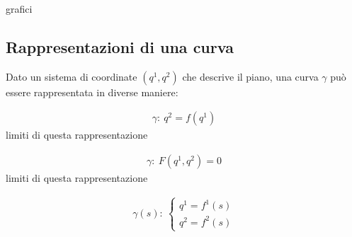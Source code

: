 \documentclass[letterpaper,10pt,italian]{jupyterBook}
\begin{document}
\sphinxAtStartPar
{}  grafici




\subsection{Rappresentazioni di una curva}
\label{\detokenize{ch/analytic_geometry/analytic_geometry_2d/curves:rappresentazioni-di-una-curva}}
\sphinxAtStartPar
Dato un sistema di coordinate \((q^1, q^2)\) che descrive il piano, una curva \(\gamma\) può essere rappresentata in diverse maniere:

\sphinxAtStartPar
{}
\begin{equation*}
\begin{split}\gamma: \ q^2 = f(q^1)\end{split}
\end{equation*}
\sphinxAtStartPar
{} limiti di questa rappresentazione

\sphinxAtStartPar
{}
\begin{equation*}
\begin{split}\gamma: \ F(q^1, q^2) = 0\end{split}
\end{equation*}
\sphinxAtStartPar
{} limiti di questa rappresentazione

\sphinxAtStartPar
{}
\begin{equation*}
\begin{split}\gamma(s): \ \begin{cases} q^1 = f^1(s) \\ q^2 = f^2(s) \end{cases}\end{split}
\end{equation*}
\sphinxAtStartPar
{} 
\end{document}
